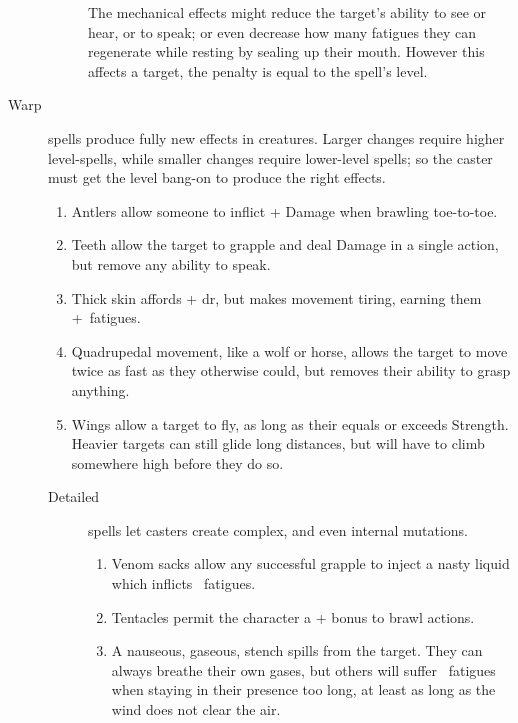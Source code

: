 \begin{multicols}{2}
\begin{description}
\begin{description}
        The mechanical effects might reduce the target's ability to see or hear, or to speak; or even decrease how many \glspl{fatigue} they can regenerate while resting by sealing up their mouth.
        However this affects a target, the penalty is equal to the spell's level.
    \end{description}
  \item[Warp]
    spells produce fully new effects in creatures.
    Larger changes require higher level-spells, while smaller changes require lower-level spells; so the caster must get the level bang-on to produce the right effects.
    \begin{enumerate}
      \item
        Antlers allow someone to inflict + Damage when brawling toe-to-toe.
      \item
        Teeth allow the target to grapple and deal Damage in a single action, but remove any ability to speak.
      \item
        Thick skin affords + \gls{dr}, but makes movement tiring, earning them +~\glspl{fatigue}.
      \item
        Quadrupedal movement, like a wolf or horse, allows the target to move twice as fast as they otherwise could, but removes their ability to grasp anything.
      \item
        Wings allow a target to fly, as long as their  equals or exceeds Strength.
        Heavier targets can still glide long distances, but will have to climb somewhere high before they do so.
    \end{enumerate}
    \begin{description}
      \item[Detailed]
        spells let casters create complex, and even internal mutations.
        \begin{enumerate}
          \item
            \setcounter{track}{\value{enumi}}%
            \addtocounter{track}{\value{track}}%
            Venom sacks allow any successful grapple to inject a nasty liquid which inflicts ~\glspl{fatigue}.
          \item
            Tentacles permit the character a + bonus to brawl actions.
          \item
            A nauseous, gaseous, stench spills from the target.
            They can always breathe their own gases, but others will suffer ~\glspl{fatigue} when staying in their presence too long, at least as long as the wind does not clear the air.

\end{enumerate}
\end{description}
\end{description}
\end{multicols}
